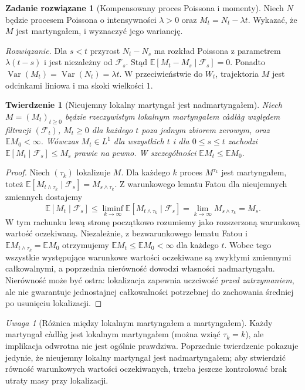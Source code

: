 \documentclass[11pt,a4paper,oneside]{report}
\numberwithin{equation}{chapter}
\theoremstyle{plain}
\newtheorem{twierdzenie}{Twierdzenie}[chapter]
\theoremstyle{definition}
\newtheorem{zadanie}{Zadanie rozwiązane}[chapter]
\theoremstyle{remark}
\newtheorem{uwaga}{Uwaga}[chapter]
\newcommand{\E}{\mathbb{E}}
\newcommand{\Var}{\operatorname{Var}}
\newcommand{\calF}{\mathcal{F}}
\begin{document}
\begin{zadanie}[Kompensowany proces Poissona i momenty]
Niech $N$ będzie procesem Poissona o intensywności
$\lambda>0$ oraz $M_t=N_t-\lambda t$. Wykazać,
że $M$ jest martyngałem, i wyznaczyć jego wariancję.

\emph{Rozwiązanie.} Dla $s<t$ przyrost
$N_t-N_s$ ma rozkład Poissona z parametrem
$\lambda(t-s)$ i jest niezależny od $\calF_s$.
Stąd $\E[M_t-M_s\mid\calF_s]=0$. Ponadto
$\Var(M_t)=\Var(N_t)=\lambda t$.
W przeciwieństwie do $W_t$, trajektoria $M$ jest
odcinkami liniowa i ma skoki wielkości $1$.
\end{zadanie}


\begin{twierdzenie}[Nieujemny lokalny martyngał jest nadmartyngałem]
\label{thm:positive-local-supermart}
Niech $M=(M_t)_{t\ge0}$ będzie rzeczywistym lokalnym
martyngałem c\`adl\`ag względem filtracji $(\calF_t)$,
$M_t\ge0$ dla każdego $t$ poza jednym zbiorem zerowym,
oraz $\E M_0<\infty$. Wówczas $M_t\in L^1$ dla wszystkich $t$
i dla $0\le s\le t$ zachodzi
$\E[M_t\mid\calF_s]\le M_s$ prawie na pewno.
W szczególności $\E M_t\le\E M_0$.
\end{twierdzenie}
\begin{proof}
Niech $(\tau_k)$ lokalizuje $M$. Dla każdego $k$ proces
$M^{\tau_k}$ jest martyngałem, toteż
$\E[M_{t\wedge\tau_k}\mid\calF_s]=M_{s\wedge\tau_k}$.
Z warunkowego lematu Fatou dla nieujemnych zmiennych dostajemy
\[
\E[M_t\mid\calF_s]
\le\liminf_{k\to\infty}\E[M_{t\wedge\tau_k}\mid\calF_s]
=\lim_{k\to\infty}M_{s\wedge\tau_k}=M_s.
\]
W tym rachunku lewą stronę początkowo rozumiemy jako rozszerzoną
warunkową wartość oczekiwaną. Niezależnie, z bezwarunkowego
lematu Fatou i $\E M_{t\wedge\tau_k}=\E M_0$ otrzymujemy
$\E M_t\le\E M_0<\infty$ dla każdego $t$.
Wobec tego wszystkie występujące warunkowe wartości
oczekiwane są zwykłymi zmiennymi całkowalnymi, a poprzednia
nierówność dowodzi własności nadmartyngału.
Nierówność może być ostra: lokalizacja zapewnia uczciwość
\emph{przed zatrzymaniem}, ale nie gwarantuje jednostajnej
całkowalności potrzebnej do zachowania średniej po usunięciu
lokalizacji.
\end{proof}

\begin{uwaga}[Różnica między lokalnym martyngałem a martyngałem]
Każdy martyngał c\`adl\`ag jest lokalnym martyngałem
(można wziąć $\tau_k=k$), ale implikacja odwrotna nie jest
ogólnie prawdziwa. Poprzednie twierdzenie pokazuje jedynie,
że nieujemny lokalny martyngał jest nadmartyngałem;
aby stwierdzić równość warunkowych wartości oczekiwanych,
trzeba jeszcze kontrolować brak utraty masy przy lokalizacji.
\end{uwaga}
\end{document}
